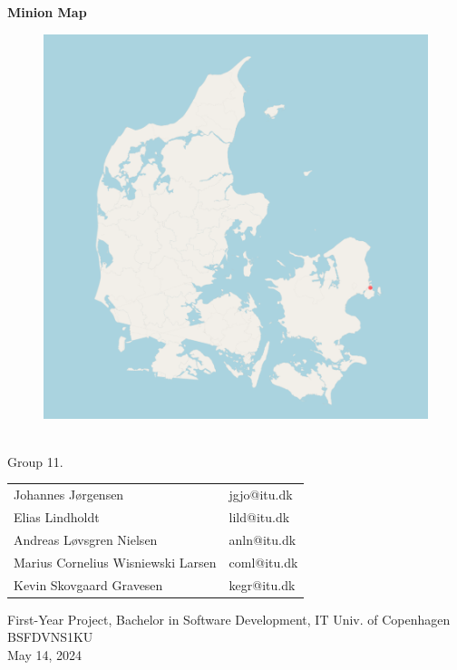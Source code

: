 \documentclass[a4paper,12pt]{article}
\begin{document}
\setcounter{tocdepth}{2}
\begin{center}
    \huge{\textbf{Minion Map}}\\
    \begin{figure}[ht]%
  \centering
  \includegraphics[width=11.5cm]{docs/material/Denmark_Photo.png}%
    \end{figure}\\
    \Large{Group 11.}\\
  \end{center}
  \begin{center}
    \begin{tabular}{p{2.85in}|p{2.85in}}
      Johannes Jørgensen & jgjo@itu.dk  \\   
      Elias Lindholdt & lild@itu.dk  \\
      Andreas Løvsgren Nielsen & anln@itu.dk\\
      Marius Cornelius Wisniewski Larsen & coml@itu.dk \\
      Kevin Skovgaard Gravesen & kegr@itu.dk \\    
      \hline
    \end{tabular}
  \end{center}
  \vspace{0.5cm}
  \begin{center}
    \vspace{0.5cm}
    First-Year Project, Bachelor in Software Development, IT Univ. of Copenhagen\\
    BSFDVNS1KU\\
    May 14, 2024
  \end{center}
\newpage
\pagestyle{fancy}
\fancyhead{} %
\fancyfoot{} %
\fancyfoot[LE,RO]{\thepage}
\renewcommand*\contentsname{Table of Contents}
\tableofcontents
\newpage



\printbibliography[title={References}]
\end{document}
